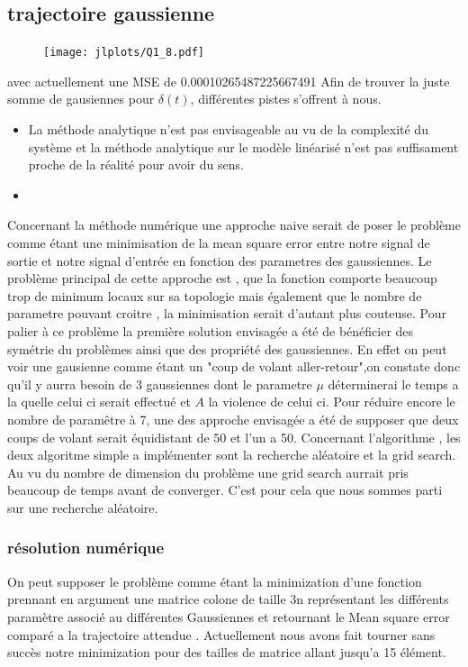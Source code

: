 \documentclass[11pt,a4paper]{article}
\begin{document}
\subsection{trajectoire gaussienne}
\begin{figure}[!h]
  \begin{center}
    \texttt{[image: jlplots/Q1\_8.pdf]}
  \end{center}
  \caption{}\label{fig:Q1_8_gaussian}
\end{figure}

avec actuellement une MSE de 0.00010265487225667491
Afin de trouver la juste somme de gausiennes pour $\delta(t)$, différentes pistes s'offrent à nous.
\begin{itemize}
  \item 
La méthode analytique n'est pas envisageable au vu de la complexité du système et la méthode analytique sur le modèle linéarisé n'est pas suffisament proche de la réalité pour avoir du sens. 
\item 
\end{itemize}
Concernant la méthode numérique une approche naive serait de poser le problème comme étant une minimisation de la mean square error entre notre signal de sortie et notre signal d'entrée en fonction des parametres des gaussiennes. 
Le problème principal de cette approche est , que la fonction comporte beaucoup trop de minimum locaux sur sa topologie mais également que le nombre de parametre pouvant croitre , la minimisation serait d'autant plus couteuse. 
Pour palier à ce problème la première solution envisagée a été de bénéficier des symétrie du problèmes ainsi que des propriété des gaussiennes.
En effet on peut voir une gausienne comme étant un "coup de volant aller-retour",on constate donc qu'il y aurra besoin de 3 gaussiennes dont le parametre $\mu$ déterminerai le temps a la quelle celui ci serait effectué et $A$ la violence de celui ci. 
Pour réduire encore le nombre de paramêtre à 7, une des approche envisagée a été de supposer que deux coups de volant serait équidistant de 50 et l'un a 50. Concernant l'algorithme , les deux algoritme simple a implémenter sont la recherche aléatoire et la grid search. Au vu du nombre de dimension du problème une grid search aurrait pris beaucoup de temps avant de converger. C'est pour cela que nous sommes parti sur une recherche aléatoire. 



\subsubsection{résolution numérique}
On peut supposer le problème comme étant la minimization d'une fonction prennant en argument une matrice colone de taille 3n représentant les différents paramètre associé au différentes Gaussiennes et retournant le Mean square error comparé a la trajectoire attendue .
Actuellement nous avons fait tourner sans succès notre minimization pour des tailles de matrice allant jusqu'a 15 élément.
\end{document}
